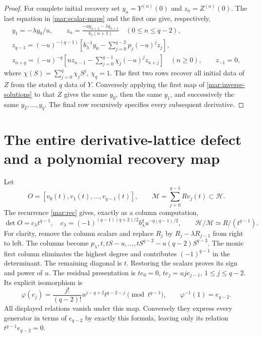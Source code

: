 \documentclass[11pt]{article}
\begin{document}
\begin{proof}
For complete initial recovery set $y_n=Y^{(n)}(0)$ and
$z_n=Z^{(n)}(0)$. The last equation in \eqref{mar:scalar-maps}
and the first one give, respectively,
\begin{equation}\tag{MAR9}\label{mar:initial}
 \begin{gathered}
 y_1=-\lambda y_0/u,\qquad
 z_n=\frac{-u y_{n+2}-\lambda y_{n+1}}{b_\lambda(n+1)}
             \quad(0\le n\le q-2),\\
 z_{q-1}=(-u)^{-(q-1)}
 \left[b_\lambda^{-1}y_0-
             \sum_{j=0}^{q-2}p_j(-u)^jz_j\right],\\
 z_{n+q}=(-u)^{-q}
 \left[nz_{n-1}-\sum_{j=0}^{q-1}\chi_j(-u)^jz_{n+j}\right]
          \quad(n\ge0),\qquad z_{-1}=0,
 \end{gathered}
\end{equation}
where $\chi(S)=\sum_{j=0}^q\chi_jS^j$, $\chi_q=1$.
The first two rows recover all initial data of $Z$ from the stated
$q$ data of $Y$. Conversely applying the first map of
\eqref{mar:inverse-solutions} to that $Z$ gives the same $y_0$,
then the same $y_1$, and successively the same $y_2,\ldots,y_q$.
The final row recursively specifies every subsequent derivative.
\end{proof}

\section{The entire derivative-lattice defect and a polynomial recovery map}
Let
\[
 O=[v_0(t),v_1(t),\ldots,v_{q-1}(t)],\qquad
 \mathscr M=\sum_{j=0}^{q-1}Rv_j(t)\subset\mathscr H.
\]
The recurrence \eqref{mar:rec} gives, exactly as a column computation,
\begin{equation}\tag{MAR10}\label{mar:lattice}
 \det O=c_\lambda t^{q-1},\quad
 c_\lambda=(-1)^{(q-1)(q+2)/2}b_\lambda^q u^{-q(q-1)/2},
 \qquad\mathscr H/\mathscr M\simeq R/(t^{q-1}).
\end{equation}
For clarity, remove the column scalars and replace $R_j$ by
$R_j-\lambda R_{j-1}$ from right to left. The columns become
$p_\lambda,t,tS-u,\ldots,tS^{q-2}-u(q-2)S^{q-3}$.
The monic first column eliminates the highest degree and contributes
$(-1)^{q-1}$ in the determinant. The remaining diagonal is $t$.
Restoring the scalars proves its sign and power of $u$.
The residual presentation is
$te_0=0$, $te_j=uj e_{j-1}$, $1\le j\le q-2$.
Its explicit isomorphism is
\begin{equation}\tag{MAR11}\label{mar:phi}
 \varphi(e_j)=\frac{j!}{(q-2)!}u^{j-q+2}t^{q-2-j}\pmod{t^{q-1}},
 \qquad\varphi^{-1}(1)=e_{q-2}.
\end{equation}
All displayed relations vanish under this map. Conversely they express
every generator in terms of $e_{q-2}$ by exactly this formula, leaving
only its relation $t^{q-1}e_{q-2}=0$.
\end{document}
